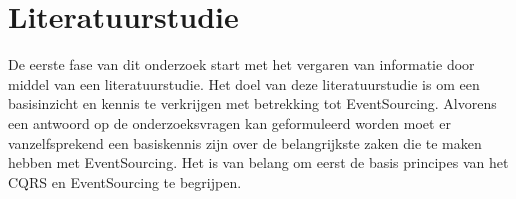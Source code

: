 \section{Literatuurstudie}
\label{sec:literatuurstudie}

De eerste fase van dit onderzoek start met het vergaren van informatie door middel van een literatuurstudie. Het doel van deze literatuurstudie is om een basisinzicht en kennis te verkrijgen met betrekking tot EventSourcing. Alvorens een antwoord op de onderzoeksvragen kan geformuleerd worden moet er vanzelfsprekend een basiskennis zijn over de belangrijkste zaken die te maken hebben met EventSourcing. Het is van belang om eerst de basis principes van het \gls{CQRS} en EventSourcing te begrijpen.